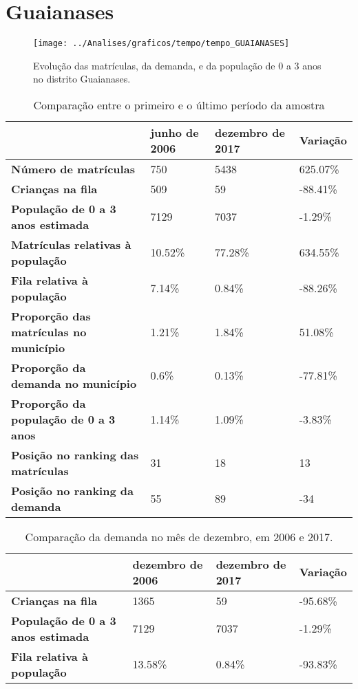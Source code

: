 \section{Guaianases}
\begin{figure}[H]
\centering
\texttt{[image: ../Analises/graficos/tempo/tempo\_GUAIANASES]}
\caption{Evolução das matrículas, da demanda, e da população de 0 a 3 anos no distrito Guaianases.}
\end{figure}
\begin{table}[H]
\begin{tabular}{|l|l|l|l|}
\hline
\textbf{}                                      & \textbf{junho de 2006}       & \textbf{dezembro de 2017}    & \textbf{Variação} \\ \hline
\textbf{Número de matrículas}                  & 750 & 5438 & 625.07\% \\ \hline
\textbf{Crianças na fila}                      & 509 & 59 & -88.41\% \\ \hline
\textbf{População de 0 a 3 anos estimada}      & 7129 & 7037 & -1.29\% \\ \hline
\textbf{Matrículas relativas à população}      & 10.52\% & 77.28\% & 634.55\% \\ \hline
\textbf{Fila relativa à população}             & 7.14\% & 0.84\% & -88.26\% \\ \hline
\textbf{Proporção das matrículas no município} & 1.21\% & 1.84\% & 51.08\% \\ \hline
\textbf{Proporção da demanda no município}     & 0.6\% & 0.13\% & -77.81\% \\ \hline
\textbf{Proporção da população de 0 a 3 anos}  & 1.14\% & 1.09\% & -3.83\% \\ \hline
\textbf{Posição no ranking das matrículas}     & 31 & 18 & 13 \\ \hline
\textbf{Posição no ranking da demanda}         & 55 & 89 & -34 \\ \hline
\end{tabular}
\caption{Comparação entre o primeiro e o último período da amostra}
\end{table}
\begin{table}[H]
\begin{tabular}{|l|l|l|l|}
\hline
\textbf{}                                 & \textbf{dezembro de 2006} & \textbf{dezembro de 2017} & \textbf{Variação} \\ \hline
\textbf{Crianças na fila}                      & 1365 & 59 & -95.68\% \\ \hline
\textbf{População de 0 a 3 anos estimada}      & 7129 & 7037 & -1.29\% \\ \hline
\textbf{Fila relativa à população}             & 13.58\% & 0.84\% & -93.83\% \\ \hline
\end{tabular}
\caption{Comparação da demanda no mês de dezembro, em 2006 e 2017.}
\end{table}
